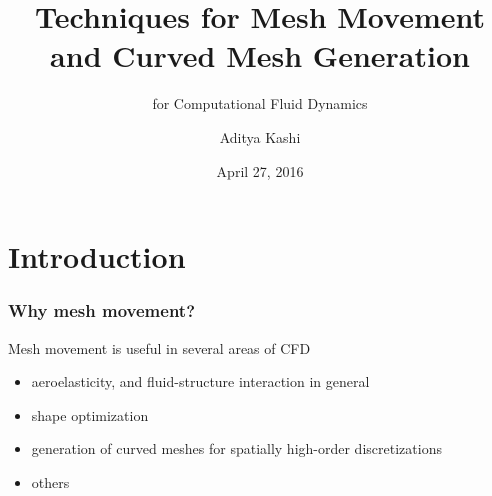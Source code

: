 \documentclass[t,12pt]{beamer}
\title[Mesh movement and curved mesh generation] %
{Techniques for Mesh Movement and Curved Mesh Generation}
\subtitle{for Computational Fluid Dynamics} %
\author[] %
{Aditya Kashi}
\institute[NCSU]
{
  Department of Mechanical and Aerospace Engineering,\\
  North Carolina State University
}
\date{April 27, 2016} %
\begin{document}
\begin{frame}
  \titlepage
\end{frame}

\section{Introduction}


\begin{frame}
  \frametitle{Why mesh movement?}
  \begin{block}{Mesh movement is useful in several areas of CFD}
	  \begin{itemize}
	  	\item aeroelasticity, and fluid-structure interaction in general
	  	\item shape optimization
	  	\item generation of curved meshes for spatially high-order discretizations
	  	\item others
	  \end{itemize}
  \end{block}
\end{frame}
\end{document}
